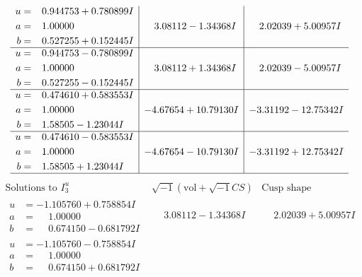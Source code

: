\documentclass[1p]{elsarticle_modified}
\theoremstyle{definition}
\newcommand{\I}{\sqrt{-1}}
\begin{document}
$$\begin{array}{c|c|c}
\begin{aligned}
u &= \phantom{-}0.944753 + 0.780899 I \\
a &= \phantom{-}1.00000\phantom{ +0.000000I} \\
b &= \phantom{-}0.527255 + 0.152445 I\end{aligned}
 & \phantom{-}3.08112 - 1.34368 I & \phantom{-}2.02039 + 5.00957 I \\ \hline\begin{aligned}
u &= \phantom{-}0.944753 - 0.780899 I \\
a &= \phantom{-}1.00000\phantom{ +0.000000I} \\
b &= \phantom{-}0.527255 - 0.152445 I\end{aligned}
 & \phantom{-}3.08112 + 1.34368 I & \phantom{-}2.02039 - 5.00957 I \\ \hline\begin{aligned}
u &= \phantom{-}0.474610 + 0.583553 I \\
a &= \phantom{-}1.00000\phantom{ +0.000000I} \\
b &= \phantom{-}1.58505 - 1.23044 I\end{aligned}
 & -4.67654 + 10.79130 I & -3.31192 - 12.75342 I \\ \hline\begin{aligned}
u &= \phantom{-}0.474610 - 0.583553 I \\
a &= \phantom{-}1.00000\phantom{ +0.000000I} \\
b &= \phantom{-}1.58505 + 1.23044 I\end{aligned}
 & -4.67654 - 10.79130 I & -3.31192 + 12.75342 I\\
 \hline 
 \end{array}$$\newpage$$\begin{array}{c|c|c}  
\text{Solutions to }I^u_{3}& \I (\text{vol} + \sqrt{-1}CS) & \text{Cusp shape}\\
 \hline 
\begin{aligned}
u &= -1.105760 + 0.758854 I \\
a &= \phantom{-}1.00000\phantom{ +0.000000I} \\
b &= \phantom{-}0.674150 - 0.681792 I\end{aligned}
 & \phantom{-}3.08112 - 1.34368 I & \phantom{-}2.02039 + 5.00957 I \\ \hline\begin{aligned}
u &= -1.105760 - 0.758854 I \\
a &= \phantom{-}1.00000\phantom{ +0.000000I} \\
b &= \phantom{-}0.674150 + 0.681792 I\end{aligned}

\end{array}$$
\end{document}
